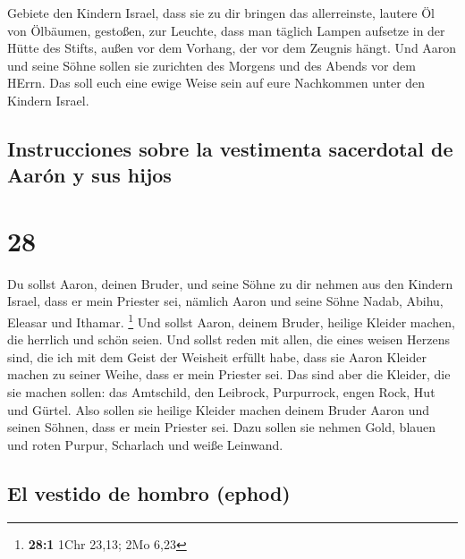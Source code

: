 Gebiete den Kindern Israel, dass sie zu dir bringen das
allerreinste, lautere Öl von Ölbäumen, gestoßen, zur Leuchte, dass man
täglich Lampen aufsetze  in der Hütte des Stifts, außen
vor dem Vorhang, der vor dem Zeugnis hängt. Und Aaron und seine Söhne
sollen sie zurichten des Morgens und des Abends vor dem HErrn. Das soll
euch eine ewige Weise sein auf eure Nachkommen unter den Kindern Israel.

\hypertarget{instrucciones-sobre-la-vestimenta-sacerdotal-de-aaruxf3n-y-sus-hijos}{%
\subsection{Instrucciones sobre la vestimenta sacerdotal de Aarón y sus
hijos}\label{instrucciones-sobre-la-vestimenta-sacerdotal-de-aaruxf3n-y-sus-hijos}}

\hypertarget{section-27}{%
\section{28}\label{section-27}}

 Du sollst Aaron, deinen Bruder, und seine Söhne zu dir
nehmen aus den Kindern Israel, dass er mein Priester sei, nämlich Aaron
und seine Söhne Nadab, Abihu, Eleasar und Ithamar. \footnote{\textbf{28:1}
  1Chr 23,13; 2Mo 6,23}  Und sollst Aaron, deinem Bruder,
heilige Kleider machen, die herrlich und schön seien.  Und
sollst reden mit allen, die eines weisen Herzens sind, die ich mit dem
Geist der Weisheit erfüllt habe, dass sie Aaron Kleider machen zu seiner
Weihe, dass er mein Priester sei.  Das sind aber die
Kleider, die sie machen sollen: das Amtschild, den Leibrock, Purpurrock,
engen Rock, Hut und Gürtel. Also sollen sie heilige Kleider machen
deinem Bruder Aaron und seinen Söhnen, dass er mein Priester sei.
 Dazu sollen sie nehmen Gold, blauen und roten Purpur,
Scharlach und weiße Leinwand.

\hypertarget{el-vestido-de-hombro-ephod}{%
\subsection{El vestido de hombro
(ephod)}\label{el-vestido-de-hombro-ephod}}

